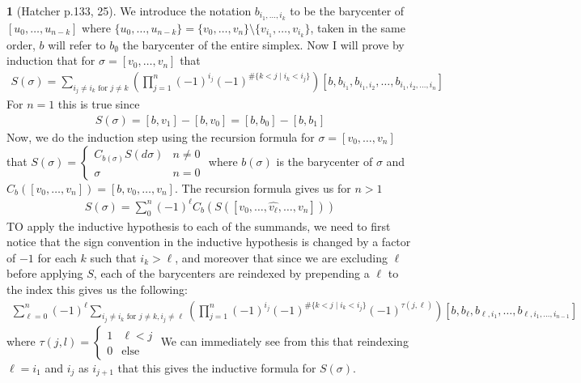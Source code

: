 \documentclass[10.5pt]{article}
\theoremstyle{definition}
\newtheorem{pb}{}
\newcommand{\set}[1]{\{#1\}}
\begin{document}
    \begin{pb}[Hatcher p.133, 25]
        We introduce the notation \(b_{i_1,\hdots,i_k}\) to be the barycenter of \([u_0,\hdots,u_{n-k}]\) where \(\set{u_0,\hdots,u_{n-k}} = \set{v_0,\hdots,v_n}\setminus \set{v_{i_1},\hdots,v_{i_k}}\), taken in the same order, \(b\) will refer to \(b_\emptyset\) the barycenter of the entire simplex. Now I will prove by induction that for \(\sigma = [v_0,\hdots,v_n]\) that
        \begin{align*}
            S(\sigma) = \sum_{i_j \neq i_k \text{ for } j \neq k}\left(\prod_{j=1}^n (-1)^{i_j}(-1)^{\#\set{k < j \mid i_k < i_j}}\right)[b,b_{i_1},b_{i_1,i_2},\hdots,b_{i_1,i_2,\hdots,i_n}]
        \end{align*}
        For \(n = 1\) this is true since
        \begin{align*}
            S(\sigma) = [b,v_1] - [b,v_0] = [b,b_0] - [b,b_1]
        \end{align*}
        Now, we do the induction step using the recursion formula for \(\sigma = [v_0,\hdots,v_n]\) that \(S(\sigma) = \begin{cases}
            C_{b(\sigma)}S(d \sigma) & n \neq 0 \\
            \sigma & n = 0
        \end{cases}\)
        where \(b(\sigma)\) is the barycenter of \(\sigma\) and \(C_b([v_0,\hdots,v_n]) = [b,v_0,\hdots,v_n]\). The recursion formula gives us for \(n > 1\)
        \begin{align*}
            S(\sigma) = \sum_{0}^n (-1)^\ell C_b(S([v_0,\hdots,\widehat{v_\ell},\hdots,v_n]))
        \end{align*}
        TO apply the inductive hypothesis to each of the summands, we need to first notice that the sign convention in the inductive hypothesis is changed by a factor of \(-1\) for each \(k\) such that \(i_k > \ell\), and moreover that since we are excluding \(\ell\) before applying \(S\), each of the barycenters are reindexed by prepending a \(\ell\) to the index this gives us the following:
        \begin{align*}
            \sum_{\ell = 0}^n (-1)^{\ell} \sum_{i_j \neq i_k \text{ for } j \neq k, i_j \neq \ell}\left(\prod_{j=1}^n (-1)^{i_j}(-1)^{\#\set{k < j \mid i_k < i_j}}(-1)^{\tau(j,\ell)}\right)[b,b_{\ell},b_{\ell,i_1},\hdots,b_{\ell,i_1,\hdots,i_{n-1}}]
        \end{align*}
        where \(\tau(j,l) = \begin{cases}
            1 & \ell < j \\
            0 & \text{else}
        \end{cases}\)
        We can immediately see from this that reindexing \(\ell = i_1\) and \(i_j\) as \(i_{j+1}\) that this gives the inductive formula for \(S(\sigma)\).
    \end{pb}
\end{document}
